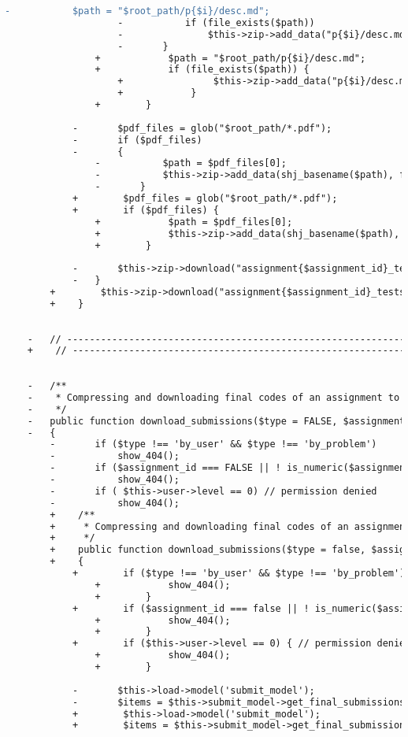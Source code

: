 \begin{lstlisting}[language=diff, caption=Perubahan pada kode Assignments.php]
					-			$path = "$root_path/p{$i}/desc.md";
					-			if (file_exists($path))
					-				$this->zip->add_data("p{$i}/desc.md", file_get_contents($path));
					-		}
				+            $path = "$root_path/p{$i}/desc.md";
				+            if (file_exists($path)) {
					+                $this->zip->add_data("p{$i}/desc.md", file_get_contents($path));
					+            }
				+        }
			
			-		$pdf_files = glob("$root_path/*.pdf");
			-		if ($pdf_files)
			-		{
				-			$path = $pdf_files[0];
				-			$this->zip->add_data(shj_basename($path), file_get_contents($path));
				-		}
			+        $pdf_files = glob("$root_path/*.pdf");
			+        if ($pdf_files) {
				+            $path = $pdf_files[0];
				+            $this->zip->add_data(shj_basename($path), file_get_contents($path));
				+        }
			
			-		$this->zip->download("assignment{$assignment_id}_tests_desc_".date('Y-m-d_H-i', shj_now()).'.zip');
			-	}
		+        $this->zip->download("assignment{$assignment_id}_tests_desc_".date('Y-m-d_H-i', shj_now()).'.zip');
		+    }
	
	
	-	// ------------------------------------------------------------------------
	+    // ------------------------------------------------------------------------
	
	
	-	/**
	-	 * Compressing and downloading final codes of an assignment to the browser
	-	 */
	-	public function download_submissions($type = FALSE, $assignment_id = FALSE)
	-	{
		-		if ($type !== 'by_user' && $type !== 'by_problem')
		-			show_404();
		-		if ($assignment_id === FALSE || ! is_numeric($assignment_id))
		-			show_404();
		-		if ( $this->user->level == 0) // permission denied
		-			show_404();
		+    /**
		+     * Compressing and downloading final codes of an assignment to the browser
		+     */
		+    public function download_submissions($type = false, $assignment_id = false)
		+    {
			+        if ($type !== 'by_user' && $type !== 'by_problem') {
				+            show_404();
				+        }
			+        if ($assignment_id === false || ! is_numeric($assignment_id)) {
				+            show_404();
				+        }
			+        if ($this->user->level == 0) { // permission denied
				+            show_404();
				+        }
			
			-		$this->load->model('submit_model');
			-		$items = $this->submit_model->get_final_submissions($assignment_id, $this->user->level, $this->user->username);
			+        $this->load->model('submit_model');
			+        $items = $this->submit_model->get_final_submissions($assignment_id, $this->user->level, $this->user->username);
			

\end{lstlisting}
